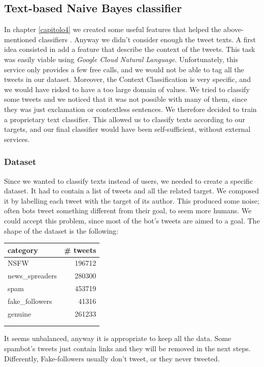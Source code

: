 \subsection{Text-based Naive Bayes classifier}
In chapter \ref{capitolo4} we created some useful features that helped the above-mentioned classifiers . Anyway we didn't consider enough the tweet texts. A first idea consisted in add a feature that describe the context of the tweets. This task was easily viable using \textit{Google Cloud Natural Language}. Unfortunately, this service only provides a few free calls, and we would not be able to tag all the tweets in our dataset. Moreover, the Context Classification is very specific, and we would have risked to have a too large domain of values. We tried to classify some tweets and we noticed that it was not possible with many of them, since they was just exclamation or contextless sentences. We therefore decided to train a proprietary text classifier. This allowed us to classify texts according to our targets, and our final classifier would have been self-sufficient, without external services.
\subsubsection{Dataset}
Since we wanted to classify texts instead of users, we needed to create a specific dataset.
It had to contain a list of tweets and all the related target. We composed it by labelling each tweet with the target of its author. This produced some noise; often bots tweet something different from their goal, to seem more humans. We could accept this problem, since most of the bot's tweets are aimed to a goal.
The shape of the dataset is the following:

\begin{center}
	\begin{tabular}{lr}
		category&\# tweets\\
		\hline\hline
		NSFW&196712\\
		news\_spreaders&280300\\
		spam&453719\\
		fake\_followers&41316\\
		genuine&261233\\
		\hline\\\\
	\end{tabular}
\end{center}

It seems unbalanced, anyway it is appropriate to keep all the data. Some spambot's tweets just contain links and they will be removed in the next steps. Differently, Fake-followers usually don't tweet, or they never tweeted.


